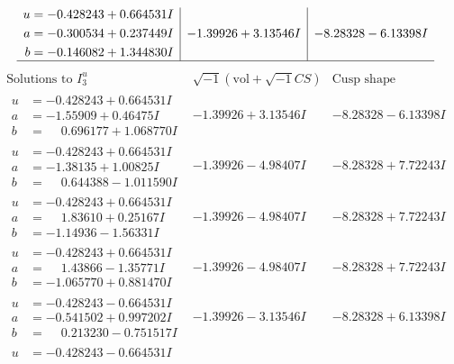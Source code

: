 \documentclass[1p]{elsarticle_modified}
\theoremstyle{definition}
\newcommand{\I}{\sqrt{-1}}
\begin{document}
$$\begin{array}{c|c|c}
\begin{aligned}
u &= -0.428243 + 0.664531 I \\
a &= -0.300534 + 0.237449 I \\
b &= -0.146082 + 1.344830 I\end{aligned}
 & -1.39926 + 3.13546 I & -8.28328 - 6.13398 I\\
 \hline 
 \end{array}$$\newpage$$\begin{array}{c|c|c}  
\text{Solutions to }I^u_{3}& \I (\text{vol} + \sqrt{-1}CS) & \text{Cusp shape}\\
 \hline 
\begin{aligned}
u &= -0.428243 + 0.664531 I \\
a &= -1.55909 + 0.46475 I \\
b &= \phantom{-}0.696177 + 1.068770 I\end{aligned}
 & -1.39926 + 3.13546 I & -8.28328 - 6.13398 I \\ \hline\begin{aligned}
u &= -0.428243 + 0.664531 I \\
a &= -1.38135 + 1.00825 I \\
b &= \phantom{-}0.644388 - 1.011590 I\end{aligned}
 & -1.39926 - 4.98407 I & -8.28328 + 7.72243 I \\ \hline\begin{aligned}
u &= -0.428243 + 0.664531 I \\
a &= \phantom{-}1.83610 + 0.25167 I \\
b &= -1.14936 - 1.56331 I\end{aligned}
 & -1.39926 - 4.98407 I & -8.28328 + 7.72243 I \\ \hline\begin{aligned}
u &= -0.428243 + 0.664531 I \\
a &= \phantom{-}1.43866 - 1.35771 I \\
b &= -1.065770 + 0.881470 I\end{aligned}
 & -1.39926 - 4.98407 I & -8.28328 + 7.72243 I \\ \hline\begin{aligned}
u &= -0.428243 - 0.664531 I \\
a &= -0.541502 + 0.997202 I \\
b &= \phantom{-}0.213230 - 0.751517 I\end{aligned}
 & -1.39926 - 3.13546 I & -8.28328 + 6.13398 I \\ \hline\begin{aligned}
u &= -0.428243 - 0.664531 I \\

\end{aligned}
\end{array}$$
\end{document}
